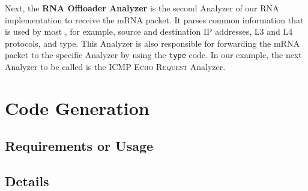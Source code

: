 
Next, the \textbf{RNA Offloader Analyzer} is the second Analyzer of our RNA implementation to receive the mRNA packet. It parses common information that is used by most \Offloaders{}, for example, source and destination IP addresses, L3 and L4 protocols, and \Offloader{} type. This Analyzer is also responsible for forwarding the mRNA packet to the \Offloader{} specific Analyzer by using the \Offloader{} \texttt{type} code. In our example, the next Analyzer to be called is the \textsc{ICMP Echo Request} Analyzer.



\section{Code Generation}
\label{sec:code_gen}


\subsection{Requirements or Usage}


\subsection{Details}

